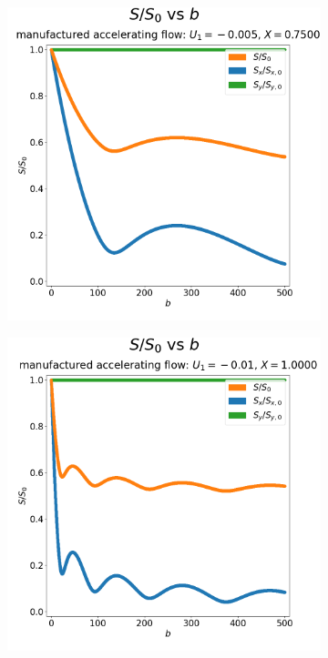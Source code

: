 \begin{figure}
\begin{centering}
\begin{subfigure}{0.45\textwidth}
\begin{centering}
                        \includegraphics[width=\textwidth]{diagrams/results-mri/simulated-placenta/mri-spins_sall-vs-b_2D_accelerating_test_6_1.png}
                        \caption{}
                        \label{fig:mri-placenta-comparison-2:blue-accel}
                    \end{centering}
                \end{subfigure}
                \begin{subfigure}{0.45\textwidth}
                    \begin{centering}
                        \includegraphics[width=\textwidth]{diagrams/results-mri/simulated-placenta/mri-spins_sall-vs-b_2D_accelerating_test_7_1.png}

\end{centering}
\end{subfigure}
\end{centering}
\end{figure}
